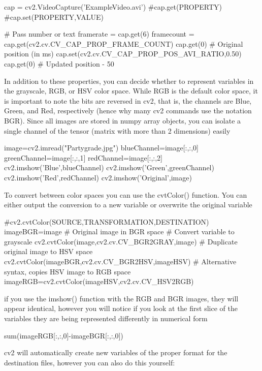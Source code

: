 \documentclass[a4paper,12pt]{article}
\begin{document}
\begin{python}
cap = cv2.VideoCapture('ExampleVideo.avi')
#cap.get(PROPERTY)
#cap.set(PROPERTY,VALUE)

# Pass number or text
framerate = cap.get(6) 
framecount = cap.get(cv2.cv.CV_CAP_PROP_FRAME_COUNT)
cap.get(0) # Original position (in ms)
cap.set(cv2.cv.CV_CAP_PROP_POS_AVI_RATIO,0.50) 
cap.get(0) # Updated position - 50%
\end{python}

In addition to these properties, you can decide whether to represent variables in the grayscale, RGB, or HSV color space. While RGB is the default color space, it is important to note the bits are reversed in cv2, that is, the channels are Blue, Green, and Red, respectively (hence why many cv2 commands use the notation BGR). Since all images are stored in numpy array objects, you can isolate a single channel of the tensor (matrix with more than 2 dimensions) easily
\begin{python}
image=cv2.imread("Partygrade.jpg")
blueChannel=image[:,:,0]
greenChannel=image[:,:,1]
redChannel=image[:,:,2]
cv2.imshow('Blue',blueChannel)
cv2.imshow('Green',greenChannel)
cv2.imshow('Red',redChannel)
cv2.imshow('Original',image)
\end{python}

To convert between color spaces you can use the cvtColor() function. You can either output the conversion to a new variable or overwrite the original variable

\begin{python}
#cv2.cvtColor(SOURCE,TRANSFORMATION,DESTINATION)
imageBGR=image # Original image in BGR space
# Convert variable to grayscale
cv2.cvtColor(image,cv2.cv.CV_BGR2GRAY,image) 
# Duplicate original image to HSV space
cv2.cvtColor(imageBGR,cv2.cv.CV_BGR2HSV,imageHSV)
# Alternative syntax, copies HSV image to RGB space
imageRGB=cv2.cvtColor(imageHSV,cv2.cv.CV_HSV2RGB)
\end{python}

if you use the imshow() function with the RGB and BGR images, they will appear identical, however you will notice if you look at the first slice of the variables they are being represented differently in numerical form
\begin{python}
sum(imageRGB[:,:,0]-imageBGR[:,:,0])
\end{python}
	 
cv2 will automatically create new variables of the proper format for the destination files, however you can also do this yourself:
\end{document}
